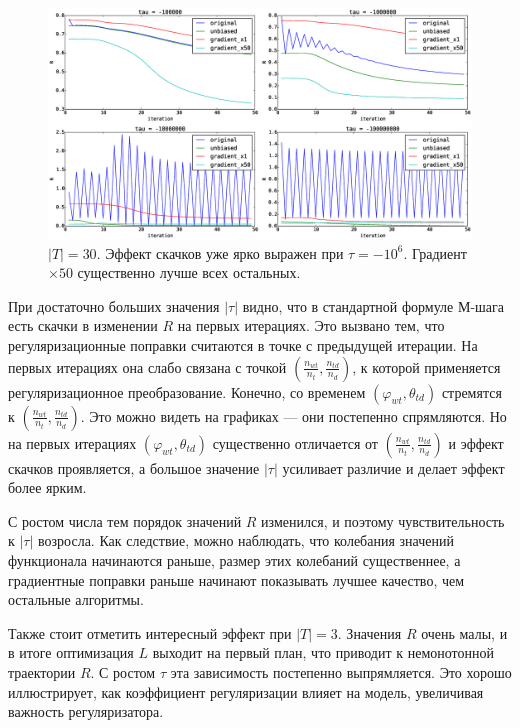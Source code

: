 \documentclass[12pt]{article}
\renewcommand{\phi}{\varphi}
\begin{document}
\begin{figure}[H]
	\centering
	\caption{$|T| = 30$. Эффект скачков уже ярко выражен при $\tau = -10^6$. Градиент $\times 50$ существенно лучше всех остальных.}    
	\includegraphics[width=1.0\linewidth]{pictures/topics_30_R_values}
\end{figure}

При достаточно больших значения $|\tau|$ видно, что в стандартной  формуле М-шага есть скачки в изменении $R$ на первых итерациях. Это вызвано тем, что регуляризационные поправки считаются в точке с предыдущей итерации. На первых итерациях  она слабо связана с точкой $\left( \frac{n_{wt}}{{n_t}}, \frac{n_{td}}{n_d}\right)$, к которой применяется регуляризационное преобразование. Конечно, со временем $(\phi_{wt}, \theta_{td})$ стремятся к $\left( \frac{n_{wt}}{{n_t}}, \frac{n_{td}}{n_d}\right)$. Это можно видеть на графиках --- они постепенно спрямляются. Но на первых итерациях $(\phi_{wt}, \theta_{td})$ существенно отличается  от $\left( \frac{n_{wt}}{{n_t}}, \frac{n_{td}}{n_d}\right)$  и эффект скачков  проявляется, а большое значение $|\tau|$ усиливает различие и делает эффект более ярким.

С ростом числа тем порядок значений $R$ изменился, и поэтому чувствительность к $|\tau|$ возросла. Как следствие, можно наблюдать, что колебания значений функционала начинаются раньше, размер этих колебаний существеннее, а градиентные поправки раньше начинают показывать лучшее качество, чем остальные алгоритмы.

Также стоит отметить интересный эффект при $|T| = 3$. Значения $R$ очень малы, и в итоге оптимизация $L$ выходит на первый план, что приводит к немонотонной траектории $R$. С ростом $\tau$ эта зависимость постепенно выпрямляется. Это хорошо иллюстрирует, как коэффициент регуляризации влияет на модель, увеличивая важность регуляризатора.
\end{document}
